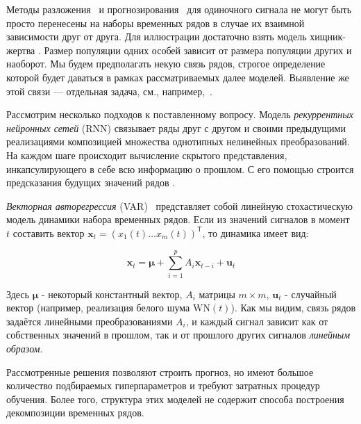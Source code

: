 		Методы разложения~\cite{enders2010applied, x11, cleveland90} и прогнозирования~\cite{3b1355aedd1041f1853e609a410576f3, enders2010applied, Box_Jenkins_methodology} для одиночного сигнала не могут быть просто перенесены на наборы временных рядов в случае их взаимной зависимости друг от друга. Для иллюстрации достаточно взять модель хищник-жертва \cite{Volterra:1928}. Размер популяции одних особей зависит от размера популяции других и наоборот. Мы будем предполагать некую связь рядов, строгое определение которой будет даваться в рамках рассматриваемых далее моделей. Выявление же этой связи --- отдельная задача, см., например,~\cite{702ab909-8cb1-3c30-a5f1-ab4517d6cf1c, 2012Sci...338..496S}.
		
		Рассмотрим несколько подходов к поставленному вопросу. Модель \textit{рекуррентных нейронных сетей} (RNN) \cite{neco, TEALAB2018334} связывает ряды друг с другом и своими предыдущими реализациями композицией множества однотипных нелинейных преобразований. На каждом шаге происходит вычисление скрытого представления, инкапсулирующего в себе всю информацию о прошлом. С его помощью строится предсказания будущих значений рядов \cite{ZHANG2023143, HEWAMALAGE2021388}. 
		
		\textit{Векторная авторегрессия} (VAR)~\cite{VAR_model1, doi:10.1080/01621459.1962.10480664} представляет собой линейную стохастическую модель динамики набора временных рядов. Если из значений сигналов в момент $ t $ составить вектор $ \mathbf{x}_t = (x_1(t) \ldots x_m(t))^{\mathsf{T}} $, то динамика имеет вид:
		
		\begin{equation*}
			\mathbf{x}_t = \boldsymbol{\mu} + \sum\limits_{i = 1}^p A_i \mathbf{x}_{t - i} + \mathbf{u}_t
		\end{equation*}
		
		Здесь $ \boldsymbol{\mu} $ - некоторый константный вектор, $ A_i $ матрицы $ m \times m $, $ \mathbf{u}_t $ - случайный вектор (например, реализация белого шума $ \text{WN}(t) $). Как мы видим, связь рядов задаётся линейными преобразованиями $ A_i $, и каждый сигнал зависит как от собственных значений в прошлом, так и от прошлого других сигналов \textit{линейным образом}. 	
		
		Рассмотренные решения позволяют строить прогноз, но имеют большое количество подбираемых гиперпараметров и требуют затратных процедур обучения. Более того, структура этих моделей не содержит способа построения декомпозиции временных рядов. 
		

